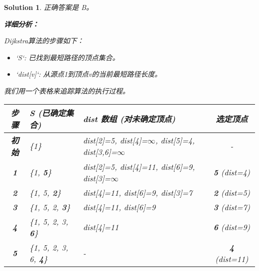 \documentclass[UTF8]{report}
\newtheorem{solution}{Solution}
\theoremstyle{MyLineTheoremStyle} %
\theoremstyle{MyBlockTheoremStyle} %
\theoremstyle{MySubsubsectionStyle} %
\begin{document}
\begin{solution}
正确答案是 B。

\textbf{详细分析：}

Dijkstra算法的步骤如下：
\begin{itemize}
    \item `S`: 已找到最短路径的顶点集合。
    \item `dist[v]`: 从源点1到顶点v的当前最短路径长度。
\end{itemize}

我们用一个表格来追踪算法的执行过程。

\begin{table}[h!]
\centering
\begin{tabular}{|c|l|l|c|}
\hline
\textbf{步骤} & \textbf{S (已确定集合)} & \textbf{dist 数组 (对未确定顶点)} & \textbf{选定顶点} \\ \hline
\textbf{初始} & \{1\} & dist[2]=5, dist[4]=$\infty$, dist[5]=4, dist[3,6]=$\infty$ & - \\ \hline
\textbf{1} & \{1, \textbf{5}\} & dist[2]=5, dist[4]=11, dist[6]=9, dist[3]=$\infty$ & \textbf{5} (dist=4) \\ \hline
\textbf{2} & \{1, 5, \textbf{2}\} & dist[4]=11, dist[6]=9, dist[3]=7 & \textbf{2} (dist=5) \\ \hline
\textbf{3} & \{1, 5, 2, \textbf{3}\} & dist[4]=11, dist[6]=9 & \textbf{3} (dist=7) \\ \hline
\textbf{4} & \{1, 5, 2, 3, \textbf{6}\} & dist[4]=11 & \textbf{6} (dist=9) \\ \hline
\textbf{5} & \{1, 5, 2, 3, 6, \textbf{4}\} & - & \textbf{4} (dist=11) \\ \hline
\end{tabular}
\end{table}


\end{solution}
\end{document}
